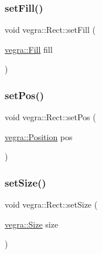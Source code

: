 \subsubsection{\texorpdfstring{set\+Fill()}{setFill()}}
{\footnotesize\ttfamily void vegra\+::\+Rect\+::set\+Fill (\begin{DoxyParamCaption}\item[{\mbox{\hyperlink{structvegra_1_1Fill}{vegra\+::\+Fill}}}]{fill }\end{DoxyParamCaption})\hspace{0.3cm}{\ttfamily [inline]}}

\mbox{\label{structvegra_1_1Rect_ae4f9a214f68dd59bc5fc5fda2c746add}} 
\subsubsection{\texorpdfstring{set\+Pos()}{setPos()}}
{\footnotesize\ttfamily void vegra\+::\+Rect\+::set\+Pos (\begin{DoxyParamCaption}\item[{\mbox{\hyperlink{structvegra_1_1Position}{vegra\+::\+Position}}}]{pos }\end{DoxyParamCaption})\hspace{0.3cm}{\ttfamily [inline]}}

\mbox{\label{structvegra_1_1Rect_a5aae282d87d00e7912620eee07b1c588}} 
\subsubsection{\texorpdfstring{set\+Size()}{setSize()}}
{\footnotesize\ttfamily void vegra\+::\+Rect\+::set\+Size (\begin{DoxyParamCaption}\item[{\mbox{\hyperlink{structvegra_1_1Size}{vegra\+::\+Size}}}]{size }\end{DoxyParamCaption})\hspace{0.3cm}{\ttfamily [inline]}}

\mbox{\label{structvegra_1_1Rect_a646ee5d4a13f051a08e03efcaecf8afb}} 
